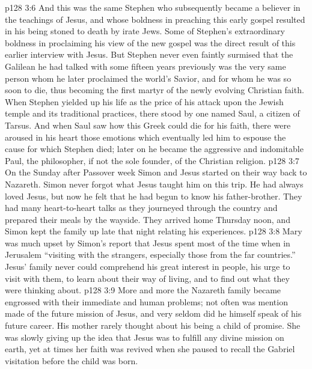 \vs p128 3:6 And this was the same Stephen who subsequently became a believer in the teachings of Jesus, and whose boldness in preaching this early gospel resulted in his being stoned to death by irate Jews. Some of Stephen’s extraordinary boldness in proclaiming his view of the new gospel was the direct result of this earlier interview with Jesus. But Stephen never even faintly surmised that the Galilean he had talked with some fifteen years previously was the very same person whom he later proclaimed the world’s Savior, and for whom he was so soon to die, thus becoming the first martyr of the newly evolving Christian faith. When Stephen yielded up his life as the price of his attack upon the Jewish temple and its traditional practices, there stood by one named Saul, a citizen of Tarsus. And when Saul saw how this Greek could die for his faith, there were aroused in his heart those emotions which eventually led him to espouse the cause for which Stephen died; later on he became the aggressive and indomitable Paul, the philosopher, if not the sole founder, of the Christian religion.\plusone
\pc \vs p128 3:7 On the Sunday after Passover week Simon and Jesus started on their way back to Nazareth. Simon never forgot what Jesus taught him on this trip. He had always loved Jesus, but now he felt that he had begun to know his father\hyp{}brother. They had many heart\hyp{}to\hyp{}heart talks as they journeyed through the country and prepared their meals by the wayside. They arrived home Thursday noon, and Simon kept the family up late that night relating his experiences.
\vs p128 3:8 Mary was much upset by Simon’s report that Jesus spent most of the time when in Jerusalem “visiting with the strangers, especially those from the far countries.” Jesus’ family never could comprehend his great interest in people, his urge to visit with them, to learn about their way of living, and to find out what they were thinking about.
\pc \vs p128 3:9 More and more the Nazareth family became engrossed with their immediate and human problems; not often was mention made of the future mission of Jesus, and very seldom did he himself speak of his future career. His mother rarely thought about his being a child of promise. She was slowly giving up the idea that Jesus was to fulfill any divine mission on earth, yet at times her faith was revived when she paused to recall the Gabriel visitation before the child was born.
%
